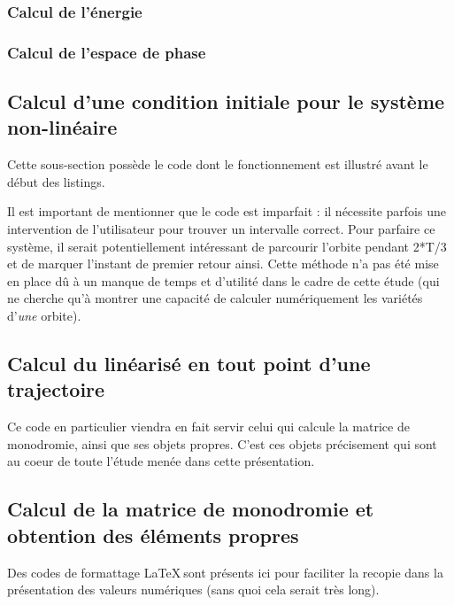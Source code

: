\documentclass[12pt]{article}
\theoremstyle{definition}
\theoremstyle{definition}
\begin{document}
	\subsubsection{Calcul de l'énergie}
	
	
	\subsubsection{Calcul de l'espace de phase}
	
	
	
	\clearpage
	\subsection{Calcul d'une condition initiale pour le système non-linéaire}
	Cette sous-section possède le code dont le fonctionnement est illustré avant le début des listings.
	
	
	Il est important de mentionner que le code est imparfait : il nécessite parfois une intervention de l'utilisateur pour trouver un intervalle correct. Pour parfaire ce système, il serait potentiellement intéressant de parcourir l'orbite pendant 2*T/3 et de marquer l'instant de premier retour ainsi. Cette méthode n'a pas été mise en place dû à un manque de temps et d'utilité dans le cadre de cette étude (qui ne cherche qu'à montrer une capacité de calculer numériquement les variétés d'\textit{une} orbite).
	
	\clearpage
	\subsection{Calcul du linéarisé en tout point d'une trajectoire}
	Ce code en particulier viendra en fait servir celui qui calcule la matrice de monodromie, ainsi que ses objets propres. C'est ces objets précisement qui sont au coeur de toute l'étude menée dans cette présentation.
	
	
	\clearpage
	\subsection{Calcul de la matrice de monodromie et obtention des éléments propres}
	Des codes de formattage \LaTeX $\:$sont présents ici pour faciliter la recopie dans la présentation des valeurs numériques (sans quoi cela serait très long).
	
	
\end{document}
